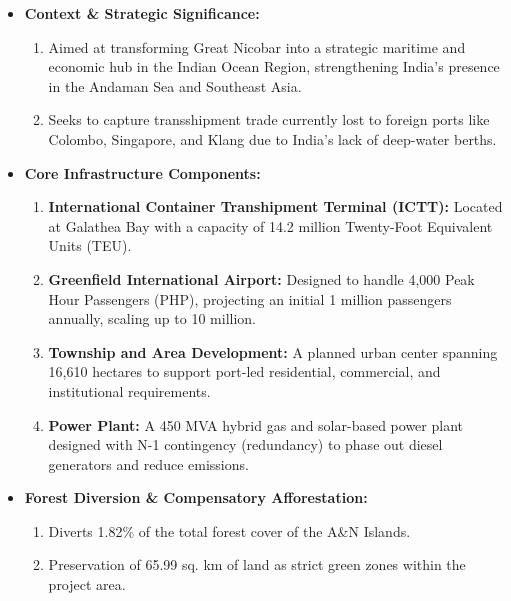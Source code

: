 \begin{itemize}
    \item \textbf{Context \& Strategic Significance:} 
    \begin{enumerate}
        \item Aimed at transforming Great Nicobar into a strategic maritime and economic hub in the Indian Ocean Region, strengthening India's presence in the Andaman Sea and Southeast Asia.
        \item Seeks to capture transshipment trade currently lost to foreign ports like Colombo, Singapore, and Klang due to India's lack of deep-water berths.
    \end{enumerate}

    \item \textbf{Core Infrastructure Components:}
    \begin{enumerate}
        \item \textbf{International Container Transhipment Terminal (ICTT):} Located at Galathea Bay with a capacity of 14.2 million Twenty-Foot Equivalent Units (TEU).
        \item \textbf{Greenfield International Airport:} Designed to handle 4,000 Peak Hour Passengers (PHP), projecting an initial 1 million passengers annually, scaling up to 10 million.
        \item \textbf{Township and Area Development:} A planned urban center spanning 16,610 hectares to support port-led residential, commercial, and institutional requirements.
        \item \textbf{Power Plant:} A 450 MVA hybrid gas and solar-based power plant designed with N-1 contingency (redundancy) to phase out diesel generators and reduce emissions.
    \end{enumerate}

    \item \textbf{Forest Diversion \& Compensatory Afforestation:}
    \begin{enumerate}
        \item Diverts 1.82\% of the total forest cover of the A\&N Islands.
        \item Preservation of 65.99 sq. km of land as strict green zones within the project area.
    \end{enumerate}


\end{itemize}
